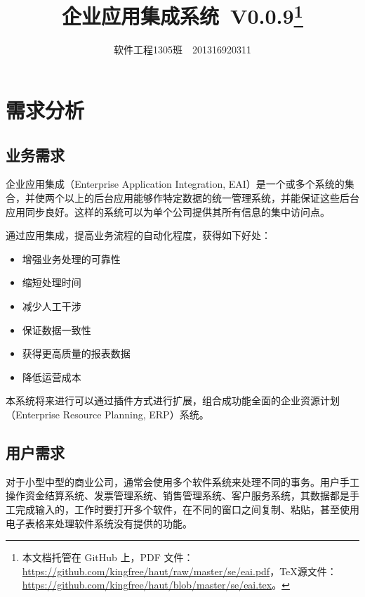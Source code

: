 \documentclass[cs4size,a4paper,nofonts]{ctexart}
\def\tjf{{\tt{田劲锋}}}
\def\titlec{企业应用集成系统}
\def\version{V0.0.9}
\begin{document}

\title{\bf\titlec~\version\footnote{本文档托管在 GitHub 上，PDF 文件：\url{https://github.com/kingfree/haut/raw/master/se/eai.pdf}，\TeX 源文件：\url{https://github.com/kingfree/haut/blob/master/se/eai.tex}。}}
\author{软件工程1305班~\quad\tjf\quad~201316920311}
\maketitle

\begin{multicols}{2}
\tableofcontents
\end{multicols}

\section{需求分析}
\subsection{业务需求}

企业应用集成（Enterprise Application Integration, EAI）是一个或多个系统的集合，并使两个以上的后台应用能够作特定数据的统一管理系统，并能保证这些后台应用同步良好。这样的系统可以为单个公司提供其所有信息的集中访问点。

通过应用集成，提高业务流程的自动化程度，获得如下好处：

\begin{itemize}
\item 增强业务处理的可靠性
\item 缩短处理时间
\item 减少人工干涉
\item 保证数据一致性
\item 获得更高质量的报表数据
\item 降低运营成本
\end{itemize}

本系统将来进行可以通过插件方式进行扩展，组合成功能全面的企业资源计划（Enterprise Resource Planning, ERP）系统。

\subsection{用户需求}

对于小型中型的商业公司，通常会使用多个软件系统来处理不同的事务。用户手工操作资金结算系统、发票管理系统、销售管理系统、客户服务系统，其数据都是手工完成输入的，工作时要打开多个软件，在不同的窗口之间复制、粘贴，甚至使用电子表格来处理软件系统没有提供的功能。
\end{document}
